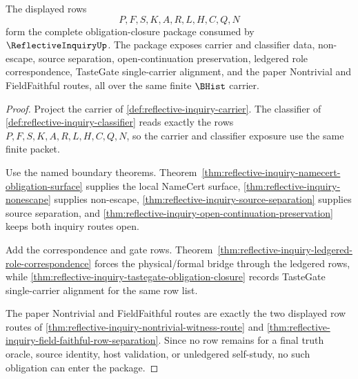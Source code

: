 \begin{theorem}
\label{thm:reflective-inquiry-obligation-closure-package}
The displayed rows
$$
P,F,S,K,A,R,L,H,C,Q,N
$$
form the complete obligation-closure package consumed by $\ReflectiveInquiryUp$. The package exposes carrier and classifier data, non-escape, source separation, open-continuation preservation, ledgered role correspondence, TasteGate single-carrier alignment, and the paper Nontrivial and FieldFaithful routes, all over the same finite $\BHist$ carrier.
\end{theorem}
\begin{proof}
Project the carrier of \autoref{def:reflective-inquiry-carrier}. The classifier of \autoref{def:reflective-inquiry-classifier} reads exactly the rows $P,F,S,K,A,R,L,H,C,Q,N$, so the carrier and classifier exposure use the same finite packet.

Use the named boundary theorems. Theorem~\ref{thm:reflective-inquiry-namecert-obligation-surface} supplies the local NameCert surface, \autoref{thm:reflective-inquiry-nonescape} supplies non-escape, \autoref{thm:reflective-inquiry-source-separation} supplies source separation, and \autoref{thm:reflective-inquiry-open-continuation-preservation} keeps both inquiry routes open.

Add the correspondence and gate rows. Theorem~\ref{thm:reflective-inquiry-ledgered-role-correspondence} forces the physical/formal bridge through the ledgered rows, while \autoref{thm:reflective-inquiry-tastegate-obligation-closure} records TasteGate single-carrier alignment for the same row list.

The paper Nontrivial and FieldFaithful routes are exactly the two displayed row routes of \autoref{thm:reflective-inquiry-nontrivial-witness-route} and \autoref{thm:reflective-inquiry-field-faithful-row-separation}. Since no row remains for a final truth oracle, source identity, host validation, or unledgered self-study, no such obligation can enter the package.
\end{proof}


